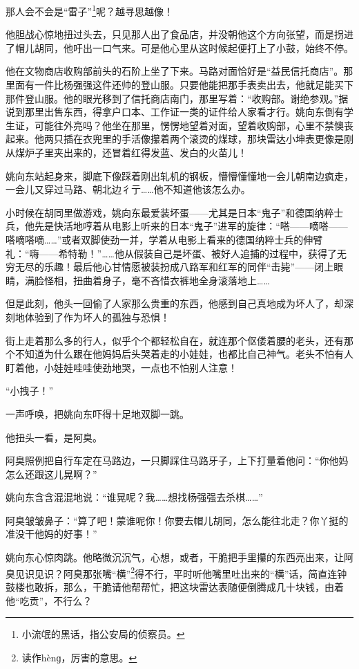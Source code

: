 \par 那人会不会是“雷子”\footnote{小流氓的黑话，指公安局的侦察员。}呢？越寻思越像！
\par 他胆战心惊地扭过头去，只见那人出了食品店，并没朝他这个方向张望，而是拐进了帽儿胡同，他吁出一口气来。可是他心里从这时候起便打上了小鼓，始终不停。
\par 他在文物商店收购部前头的石阶上坐了下来。马路对面恰好是“益民信托商店”。那里面有一件比杨强强这件还帅的登山服。只要他能把那手表卖出去，他就足能买下那件登山服。他的眼光移到了信托商店南门，那里写着：“收购部。谢绝参观。”据说到那里出售东西，得拿户口本、工作证一类的证件给人家看才行。姚向东倒有学生证，可能往外亮吗？他坐在那里，愣愣地望着对面，望着收购部，心里不禁懊丧起来。他两只插在衣兜里的手活像攥着两个滚烫的煤球，那块雷达小坤表更像是刚从煤炉子里夹出来的，还冒着红得发蓝、发白的火苗儿！
\par 姚向东站起身来，脚底下像踩着刚出轧机的钢板，懵懵懂懂地一会儿朝南边疯走，一会儿又穿过马路、朝北边彳亍……他不知道他该怎么办。
\par 小时候在胡同里做游戏，姚向东最爱装坏蛋——尤其是日本“鬼子”和德国纳粹士兵，他先是快活地哼着从电影上听来的日本“鬼子”进军的旋律：“嗒——嘀嗒——嗒嘀嗒嘀……”或者双脚使劲一并，学着从电影上看来的德国纳粹士兵的伸臂礼：“嗨——希特勒！”……他从假装自己是坏蛋、被好人追捕的过程中，获得了无穷无尽的乐趣！最后他心甘情愿被装扮成八路军和红军的同伴“击毙”——闭上眼睛，满脸怪相，扭曲着身子，毫不吝惜衣裤地全身滚落地上……
\par 但是此刻，他头一回偷了人家那么贵重的东西，他感到自己真地成为坏人了，却深刻地体验到了作为坏人的孤独与恐惧！
\par 街上走着那么多的行人，似乎个个都轻松自在，就连那个伛偻着腰的老头，还有那个不知道为什么跟在他妈妈后头哭着走的小娃娃，也都比自己神气。老头不怕有人盯着他，小娃娃哇哇使劲地哭，一点也不怕别人注意！
\par “小拽子！”
\par 一声呼唤，把姚向东吓得十足地双脚一跳。
\par 他扭头一看，是阿臭。
\par 阿臭照例把自行车定在马路边，一只脚踩住马路牙子，上下打量着他问：“你他妈怎么还跟这儿晃啊？”
\par 姚向东含含混混地说：“谁晃呢？我……想找杨强强去杀棋……”
\par 阿臭皱皱鼻子：“算了吧！蒙谁呢你！你要去帽儿胡同，怎么能往北走？你丫挺的准没干他妈的好事！”
\par 姚向东心惊肉跳。他略微沉沉气，心想，或者，干脆把手里攥的东西亮出来，让阿臭见识见识？阿臭那张嘴“横”\footnote{读作hènɡ，厉害的意思。}得不行，平时听他嘴里吐出来的“横”话，简直连钟鼓楼也敢拆，那么，干脆请他帮帮忙，把这块雷达表随便倒腾成几十块钱，由着他“吃贡”，不行么？
